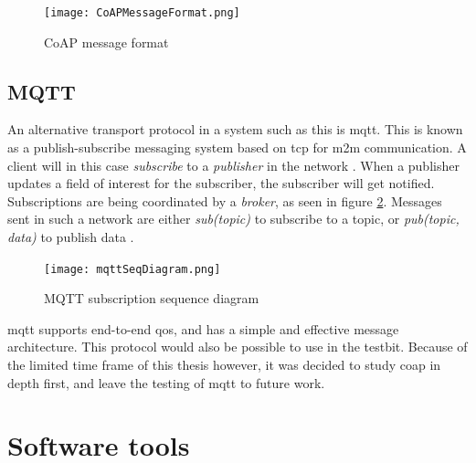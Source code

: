 
\begin{figure}[ht]
    \centering
    \texttt{[image: CoAPMessageFormat.png]}    
    \caption{CoAP message format \cite{shelby2014constrained}}
    \label{fig:CoAPMessageFormat}
\end{figure}






\subsection{MQTT}

\noindent An alternative transport protocol in a system such as this is \gls{mqtt}. This is  known as a publish-subscribe messaging system based on \gls{tcp} for \gls{m2m} communication. A client will in this case \textit{subscribe} to a \textit{publisher} in the network \cite{hunkeler2008mqtt}. When a publisher updates a field of interest for the subscriber, the subscriber will get notified. Subscriptions are being coordinated by a \textit{broker}, as seen in figure \ref{fig:mqttSeqDiagram}. Messages sent in such a network are either \textit{sub(topic)} to subscribe to a topic, or \textit{pub(topic, data)} to publish data \cite{mqttWebsite}. 


\begin{figure}[ht]
    \centering
    \texttt{[image: mqttSeqDiagram.png]}    
    \caption{MQTT subscription sequence diagram \cite{hunkeler2008mqtt}}
    \label{fig:mqttSeqDiagram}
\end{figure}

\noindent \gls{mqtt} supports end-to-end \gls{qos}, and has a simple and effective message architecture. This protocol would also be possible to use in the testbit. Because of the limited time frame of this thesis however, it was decided to study \gls{coap} in depth first, and leave the testing of \gls{mqtt} to future work. 


\section{Software tools}

